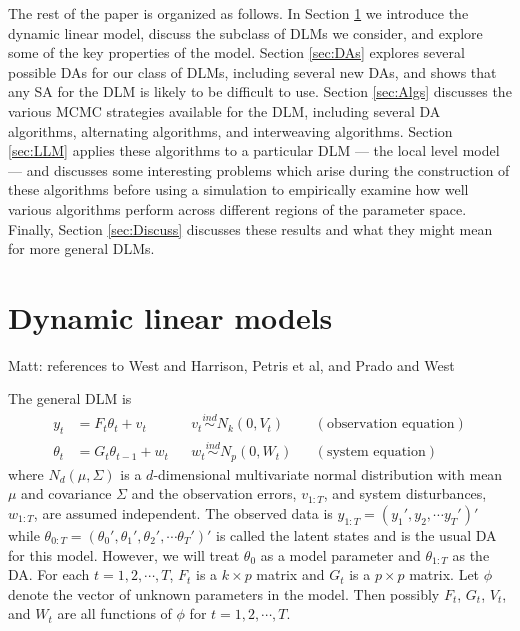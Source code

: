 \documentclass{article}
\newcommand{\matt}[1]{{\color{red} Matt: #1}}
\begin{document}
The rest of the paper is organized as follows. In Section \ref{sec:DLMs} we introduce the dynamic linear model, discuss the subclass of DLMs we consider, and explore some of the key properties of the model. Section \ref{sec:DAs} explores several possible DAs for our class of DLMs, including several new DAs, and shows that any SA for the DLM is likely to be difficult to use. Section \ref{sec:Algs} discusses the various MCMC strategies available for the DLM, including several DA algorithms, alternating algorithms, and interweaving algorithms. Section \ref{sec:LLM} applies these algorithms to a particular DLM --- the local level model --- and discusses some interesting problems which arise during the construction of these algorithms before using a simulation to empirically examine how well various algorithms perform across different regions of the parameter space. Finally, Section \ref{sec:Discuss} discusses these results and what they might mean for more general DLMs.

\section{Dynamic linear models} \label{sec:DLMs} \matt{references to West and Harrison, Petris et al, and Prado and West}

The general DLM is
\begin{align}
y_t &= F_t\theta_t + v_t && v_t \stackrel{ind}{\sim} N_k(0,V_t) && (\mbox{observation equation}) \label{dlmtdobseq}\\
 \theta_t &= G_t\theta_{t-1} + w_t && w_t \stackrel{ind}{\sim} N_p(0,W_t) && (\mbox{system equation}) \label{dlmtdsyseq}
\end{align}
where $N_d(\mu,\Sigma)$ is a $d$-dimensional multivariate normal distribution with mean $\mu$ and covariance $\Sigma$ and the observation errors, $v_{1:T}$, and system disturbances, $w_{1:T}$, are assumed independent. The observed data is $y_{1:T} = (y_1',y_2,\cdots y_T')'$ while $\theta_{0:T}=(\theta_0',\theta_1',\theta_2',\cdots \theta_T')'$ is called the latent states and is the usual DA for this model. However, we will treat $\theta_0$ as a model parameter and $\theta_{1:T}$ as the DA. For each $t=1,2,\cdots,T$, $F_t$ is a $k\times p$ matrix and $G_t$ is a $p\times p$ matrix. Let $\phi$ denote the vector of unknown parameters in the model. Then possibly $F_{t}$, $G_{t}$, $V_{t}$, and $W_{t}$ are all functions of $\phi$ for $t=1,2,\cdots,T$. 
\end{document}
